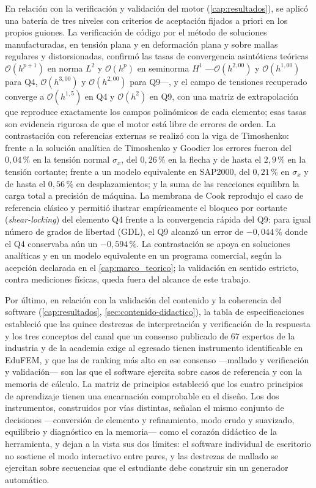 En relación con la verificación y validación del motor (\autoref{cap:resultados}), se aplicó una batería de tres niveles con criterios de aceptación fijados a priori en los propios guiones. La verificación de código por el método de soluciones manufacturadas, en tensión plana y en deformación plana y sobre mallas regulares y distorsionadas, confirmó las tasas de convergencia asintóticas teóricas $\mathcal{O}(h^{p+1})$ en norma $L^2$ y $\mathcal{O}(h^{p})$ en seminorma $H^1$ —$\mathcal{O}(h^{2{,}00})$ y $\mathcal{O}(h^{1{,}00})$ para Q4, $\mathcal{O}(h^{3{,}00})$ y $\mathcal{O}(h^{2{,}00})$ para Q9—, y el campo de tensiones recuperado converge a $\mathcal{O}(h^{1{,}5})$ en Q4 y $\mathcal{O}(h^{2})$ en Q9, con una matriz de extrapolación que reproduce exactamente los campos polinómicos de cada elemento; esas tasas son evidencia rigurosa de que el motor está libre de errores de orden. La contrastación con referencias externas se realizó con la viga de Timoshenko: frente a la solución analítica de Timoshenko y Goodier los errores fueron del $0{,}04\,\%$ en la tensión normal $\sigma_x$, del $0{,}26\,\%$ en la flecha y de hasta el $2{,}9\,\%$ en la tensión cortante; frente a un modelo equivalente en SAP2000, del $0{,}21\,\%$ en $\sigma_x$ y de hasta el $0{,}56\,\%$ en desplazamientos; y la suma de las reacciones equilibra la carga total a precisión de máquina. La membrana de Cook reprodujo el caso de referencia clásico y permitió ilustrar empíricamente el bloqueo por cortante (\emph{shear-locking}) del elemento Q4 frente a la convergencia rápida del Q9: para igual número de grados de libertad (GDL), el Q9 alcanzó un error de $-0{,}044\,\%$ donde el Q4 conservaba aún un $-0{,}594\,\%$. La contrastación se apoya en soluciones analíticas y en un modelo equivalente en un programa comercial, según la acepción declarada en el \autoref{cap:marco_teorico}; la validación en sentido estricto, contra mediciones físicas, queda fuera del alcance de este trabajo.

Por último, en relación con la validación del contenido y la coherencia del software (\autoref{cap:resultados}, \autoref{sec:contenido-didactico}), la tabla de especificaciones estableció que las quince destrezas de interpretación y verificación de la respuesta y los tres conceptos del canal que un consenso publicado de 67 expertos de la industria y de la academia exige al egresado tienen instrumento identificable en EduFEM, y que las de ranking más alto en ese consenso —mallado y verificación y validación— son las que el software ejercita sobre casos de referencia y con la memoria de cálculo. La matriz de principios estableció que los cuatro principios de aprendizaje tienen una encarnación comprobable en el diseño. Los dos instrumentos, construidos por vías distintas, señalan el mismo conjunto de decisiones —conversión de elemento y refinamiento, modo crudo y suavizado, equilibrio y diagnóstico en la memoria— como el corazón didáctico de la herramienta, y dejan a la vista sus dos límites: el software individual de escritorio no sostiene el modo interactivo entre pares, y las destrezas de mallado se ejercitan sobre secuencias que el estudiante debe construir sin un generador automático.

